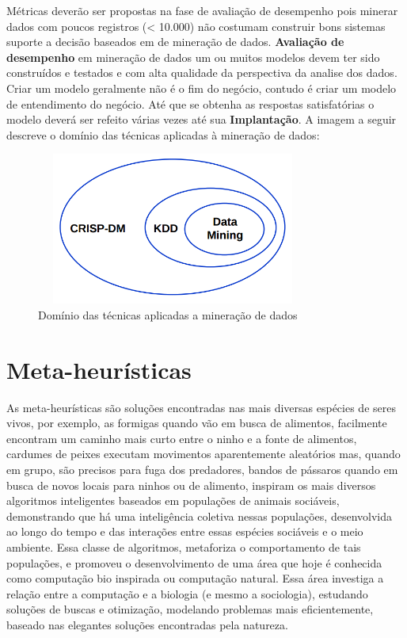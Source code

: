 \documentclass[conference,compsoc]{IEEEtran}
\begin{document}
Métricas deverão ser propostas na fase de avaliação de desempenho pois minerar dados com poucos registros (< 10.000) não costumam construir bons sistemas suporte a decisão baseados em de mineração de dados.
\textbf{Avaliação de desempenho} em mineração de dados um ou muitos modelos devem ter sido construídos e testados e com alta qualidade da perspectiva da analise  dos dados.
Criar um modelo geralmente não é o fim do negócio, contudo é criar um modelo de entendimento do negócio. Até que se obtenha as respostas satisfatórias o modelo deverá ser refeito várias vezes até sua \textbf{Implantação}. A imagem a seguir descreve o domínio das técnicas aplicadas à mineração de dados:

\begin{figure}[!ht]
\centering
\caption{Domínio das técnicas aplicadas a mineração de dados}
\flushleft
\includegraphics[width=90mm, height=50mm]{Figuras/RelacaoCrispKddDm.png}
\end{figure}



\section{Meta-heurísticas}


As meta-heurísticas são soluções encontradas nas mais diversas espécies de seres vivos, por exemplo, as formigas quando 
vão em busca de alimentos, facilmente encontram um caminho mais curto entre o ninho e a fonte de alimentos, cardumes de peixes 
executam movimentos aparentemente aleatórios mas, quando em grupo, são precisos para fuga dos predadores, bandos de pássaros 
quando em busca de novos locais para ninhos ou de alimento, inspiram os mais diversos algoritmos inteligentes baseados em 
populações de animais sociáveis, demonstrando que há uma inteligência coletiva nessas populações, desenvolvida ao longo do 
tempo e das interações entre essas espécies sociáveis e o meio ambiente. Essa classe de algoritmos, metaforiza o comportamento 
de tais populações, e promoveu o desenvolvimento de uma área que hoje é conhecida como computação bio inspirada ou computação 
natural. Essa área investiga a relação entre a computação e a biologia (e mesmo a sociologia), estudando soluções de buscas 
e otimização, modelando problemas mais eficientemente, baseado nas elegantes soluções encontradas pela natureza.
\end{document}
